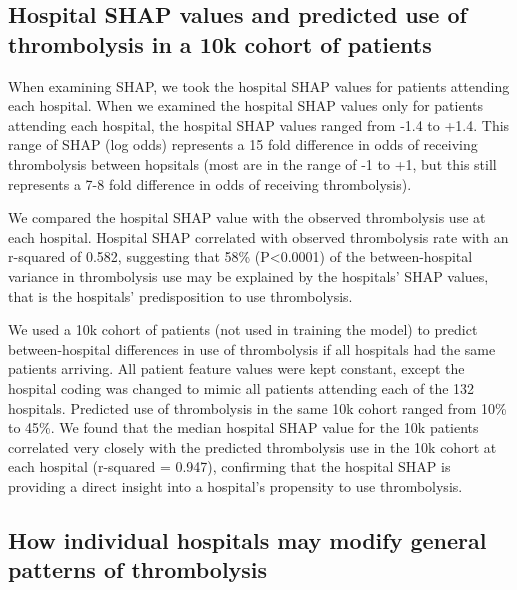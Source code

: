 
\subsection{Hospital SHAP values and predicted use of thrombolysis in a 10k cohort of patients}

When examining SHAP, we took the hospital SHAP values for patients attending each hospital. When we examined the hospital SHAP values only for patients attending each hospital, the hospital SHAP values ranged from -1.4 to +1.4. This range of SHAP (log odds) represents a 15 fold difference in odds of receiving thrombolysis between hopsitals (most are in the range of -1 to +1, but this still represents a 7-8 fold difference in odds of receiving thrombolysis).

We compared the hospital SHAP value with the observed thrombolysis use at each hospital. Hospital SHAP correlated with observed thrombolysis rate with an r-squared of 0.582, suggesting that 58\% (P<0.0001) of the between-hospital variance in thrombolysis use may be explained by the hospitals' SHAP values, that is the hospitals' predisposition to use thrombolysis.

We used a 10k cohort of patients (not used in training the model) to predict between-hospital differences in use of thrombolysis if all hospitals had the same patients arriving. All patient feature values were kept constant, except the hospital coding was changed to mimic all patients attending each of the 132 hospitals. Predicted use of thrombolysis in the same 10k cohort ranged from 10\% to 45\%. We found that the median hospital SHAP value for the 10k patients correlated very closely with the predicted thrombolysis use in the 10k cohort at each hospital (r-squared = 0.947), confirming that the hospital SHAP is providing a direct insight into a hospital's propensity to use thrombolysis.



\subsection{How individual hospitals may modify general patterns of thrombolysis}

